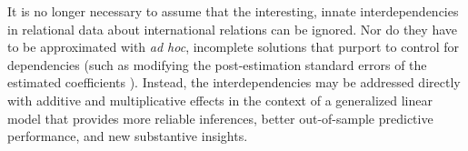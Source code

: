 It is no longer necessary to assume that the interesting, innate interdependencies in relational data about international relations can be ignored. Nor do they have to be approximated with \textit{ad hoc}, incomplete solutions that purport to control for dependencies (such as modifying the post-estimation standard errors of the estimated coefficients \citep{king:roberts:2014}). Instead, the interdependencies may be addressed directly with additive and multiplicative effects in the context of a generalized linear model that provides more reliable inferences, better out-of-sample predictive performance, and new substantive insights. 
